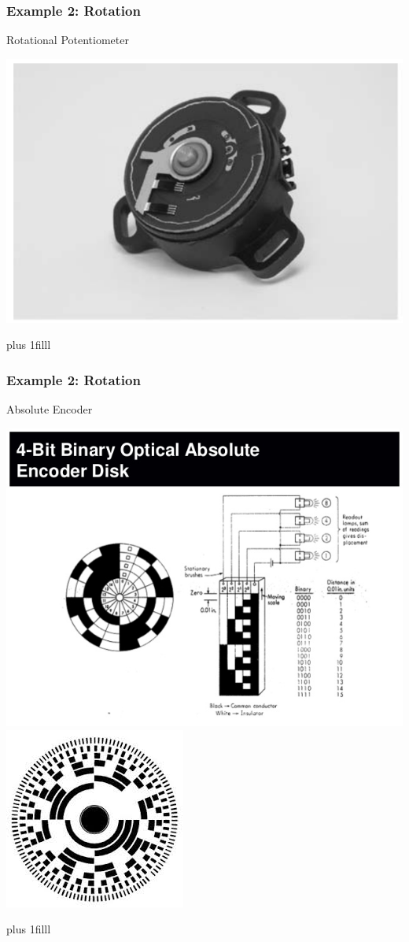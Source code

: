 \documentclass[fleqn]{beamer} %
\newcommand{\sectionIsubsectionIVtitle}{Example 2: Rotation}
\newcommand{\btVFill}{\vskip0pt plus 1filll}
\begin{document}
			\begin{frame}
				\frametitle{\sectionIsubsectionIVtitle}
				
				Rotational Potentiometer 

				\includegraphics[scale=.25]{images/rot_pot.png}


				\btVFill

			\end{frame}

			\begin{frame}
				\frametitle{\sectionIsubsectionIVtitle}
				
				Absolute Encoder  
	
				\includegraphics[scale=.35]{images/lecture1_fig1.jpg}	
				\includegraphics[scale=.25]{images/lecture1_fig2.jpg}

				\btVFill

			\end{frame}
\end{document}
